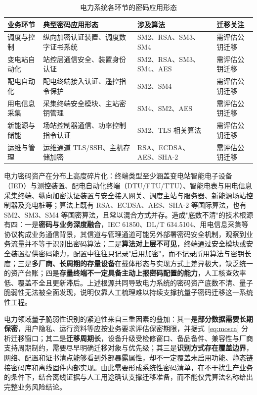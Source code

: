 \begin{table}[htbp]
    \centering
    \caption{电力系统各环节的密码应用形态}
    \label{tab:power-crypto-deployment}
    \small
    \begin{tabularx}{\linewidth}{@{}p{1.9cm}p{3.4cm}p{3.0cm}X@{}}
        \toprule
        \textbf{业务环节} & \textbf{典型密码应用形态} & \textbf{涉及算法} & \textbf{迁移关注} \\
        \midrule
        调度与控制 & 纵向加密认证装置、调度数字证书系统 & SM2、RSA、SM3、SM4 & 需评估公钥迁移 \\
        \midrule
        变电站自动化 & 站控层通信安全、装置身份认证 & SM2、RSA、SM3、SM4、AES & 需评估公钥迁移 \\
        \midrule
        配电自动化 & 配电终端接入认证、遥控指令保护 & SM2、SM4 & 需评估公钥迁移 \\
        \midrule
        用电信息采集 & 采集终端安全模块、主站密钥管理 & SM4、SM2、AES & 需评估公钥迁移 \\
        \midrule
        新能源与储能 & 场站控制器通信、功率控制指令认证 & SM2、TLS 相关算法 & 需评估公钥迁移 \\
        \midrule
        运维与管理 & 运维通道 TLS/SSH、主机存储加密 & RSA、ECDSA、AES、SHA-2 & 需评估公钥迁移 \\
        \bottomrule
    \end{tabularx}
\end{table}

电力密码资产在分布上高度碎片化：终端类型至少涵盖变电站智能电子设备（IED）与测控装置、配电自动化终端（DTU/FTU/TTU）、智能电表与用电信息采集终端、纵向加密认证装置与安全接入网关、调度主站与服务器、新能源场站控制器及充电桩等；算法上既有 RSA、ECDSA、AES、SHA-2 等国际算法，也有 SM2、SM3、SM4 等国密算法，且常以混合方式并存。造成"底数不清"的技术根源有四：一是\textbf{密码与业务深度融合}，IEC 61850、DL/T 634.5104、用电信息采集等协议构成业务通信背景，其信道与管理通道可能另外部署密码安全机制\cite{iec61850,dlt634}，观察到业务流量并不等于识别出密码算法；二是\textbf{算法对上层不可见}，终端通过安全模块或安全装置提供密码能力，配置中往往只记录"启用加密"，而不记录所用算法与密钥长度；三是\textbf{多厂商、长周期的存量设备}在载体形态与实现方式上差异极大，缺乏统一的资产台账；四是\textbf{存量终端不一定具备主动上报密码配置的能力}，人工核查效率低、覆盖不全且更新滞后。上述根源共同导致电力系统的密码资产底数不清、量子脆弱性无法被全面发现，说明仅靠人工梳理难以持续支撑抗量子密码迁移这一系统性工程。

电力领域量子脆弱性识别的紧迫性来自三重因素的叠加：其一是\textbf{部分数据需要长期保密}，用户隐私、运行资料等应按业务要求评估保密期限，并据式~\eqref{eq:mosca} 分析迁移窗口；其二是\textbf{迁移周期长}，设备升级受检修窗口、备品备件、兼容性与厂商支持周期制约，需要尽早明确迁移对象与优先级；其三是\textbf{识别方式存在覆盖边界}，网络、配置和证书清点能够看到外部暴露属性，却不一定覆盖未启用功能、静态链接密码库和离线固件内部实现。由此需要形成系统性密码清单，在不干扰生产业务的条件下，结合离线证据与人工用途确认支撑迁移准备，而不能仅凭算法名称给出完整业务风险结论。

